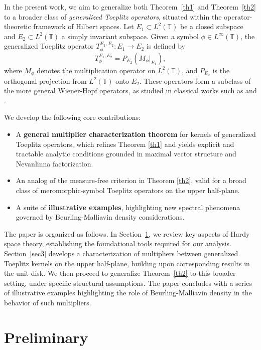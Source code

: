 \documentclass[12pt,a4paper]{amsart}
\begin{document}
In the present work, we aim to generalize both Theorem~\ref{th1} and Theorem~\ref{th2} to a broader class of \emph{generalized Toeplitz operators}, situated within the operator-theoretic framework of Hilbert spaces. Let \( E_1 \subset L^2(\mathbb{T}) \) be a closed subspace and \( E_2 \subset L^2(\mathbb{T}) \) a simply invariant subspace. Given a symbol \( \phi \in L^\infty(\mathbb{T}) \), the generalized Toeplitz operator \( T_\phi^{E_1, E_2} \colon E_1 \to E_2 \) is defined by
\[
T_\phi^{E_1,E_2} = P_{E_2} (M_\phi|_{E_1}),
\]
where \( M_\phi \) denotes the multiplication operator on \( L^2(\mathbb{T}) \), and \( P_{E_2} \) is the orthogonal projection from \( L^2(\mathbb{T}) \) onto \( E_2 \). These operators form a subclass of the more general Wiener-Hopf operators, as studied in classical works such as \cite{allen1969} and \cite{speck1985}.

\smallskip
\vspace{1ex}
\noindent We develop the following core contributions:

\begin{itemize}
	\item A \textbf{general multiplier characterization theorem} for kernels of generalized Toeplitz operators, which refines Theorem \ref{th1} and yields explicit and tractable analytic conditions grounded in maximal vector structure and Nevanlinna factorization.
	\item  An analog of the measure-free criterion in Theorem \ref{th2}, valid for a broad class of meromorphic-symbol Toeplitz operators on the upper half-plane.
	\item  A suite of \textbf{illustrative examples}, highlighting new spectral phenomena governed by Beurling-Malliavin density considerations.
\end{itemize}

The paper is organized as follows. In Section~\ref{sec2}, we review key aspects of Hardy space theory, establishing the foundational tools required for our analysis. Section~\ref{sec3} develops a characterization of multipliers between generalized Toeplitz kernels on the upper half-plane, building upon corresponding results in the unit disk. We then proceed to generalize Theorem~\ref{th2} to this broader setting, under specific structural assumptions. The paper concludes with a series of illustrative examples highlighting the role of Beurling-Malliavin density in the behavior of such multipliers.

\section{Preliminary}\label{sec2}
\end{document}
